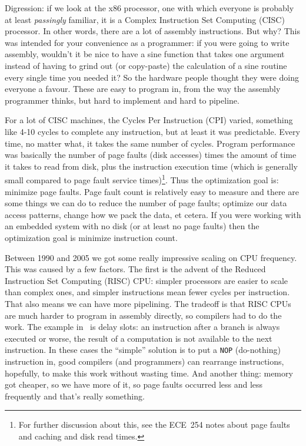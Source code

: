 Digression: if we look at the x86 processor, one with which everyone is probably at least \textit{passingly} familiar, it is a Complex Instruction Set Computing (CISC) processor. In other words, there are a lot of assembly instructions. But why? This was intended for your convenience as a programmer: if you were going to write assembly, wouldn't it be nice to have a sine function that takes one argument instead of having to grind out (or copy-paste) the calculation of a sine routine every single time you needed it? So the hardware people thought they were doing everyone a favour. These are easy to program in, from the way the assembly programmer thinks, but hard to implement and hard to pipeline. 

For a lot of CISC machines, the Cycles Per Instruction (CPI) varied, something like 4-10 cycles to complete any instruction, but at least it was predictable. Every time, no matter what, it takes the same number of cycles. Program performance was basically the number of page faults (disk accesses) times the amount of time it takes to read from disk, plus the instruction execution time (which is generally small compared to page fault service times)\footnote{For further discussion about this, see the ECE~254 notes about page faults and caching and disk read times.}. Thus the optimization goal is: minimize page faults. Page fault count is relatively easy to measure and there are some things we can do to reduce the number of page faults; optimize our data access patterns, change how we pack the data, et cetera. If you were working with an embedded system with no disk (or at least no page faults) then the optimization goal is minimize instruction count.

Between 1990 and 2005 we got some really impressive scaling on CPU frequency. This was caused by a few factors. The first is the advent of the Reduced Instruction Set Computing (RISC) CPU: simpler processors are easier to scale than complex ones, and simpler instructions mean fewer cycles per instruction. That also means we can have more pipelining. The tradeoff is that RISC CPUs are much harder to program in assembly directly, so compilers had to do the work. The example in~\cite{modern-hardware} is delay slots: an instruction after a branch is always executed or worse, the result of a computation is not available to the next instruction. In these cases the ``simple'' solution is to put a \texttt{NOP} (do-nothing) instruction in, good compilers (and programmers) can rearrange instructions, hopefully, to make this work without wasting time. And another thing: memory got cheaper, so we have more of it, so page faults occurred less and less frequently and that's really something.

